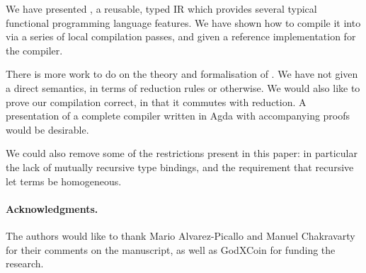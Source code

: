 We have presented \FIR{}, a reusable, typed IR which provides several typical
functional programming language features. We have shown how to compile it into
\FOMF{} via a series of local compilation passes, and given a reference
implementation for the compiler.

There is more work to do on the theory and formalisation of \FIR{}. We
have not given a direct semantics, in terms of reduction rules or otherwise.
We would also like to prove our compilation correct, in that it commutes with
reduction. A presentation of a complete compiler written in Agda with
accompanying proofs would be desirable.

We could also remove some of the restrictions present in this paper: in
particular the lack of mutually recursive type bindings, and the
requirement that recursive let terms be homogeneous.

\paragraph{Acknowledgments.}
The authors would like to thank Mario Alvarez-Picallo and Manuel Chakravarty
for their comments on the manuscript, as well as GodXCoin for funding the research.





